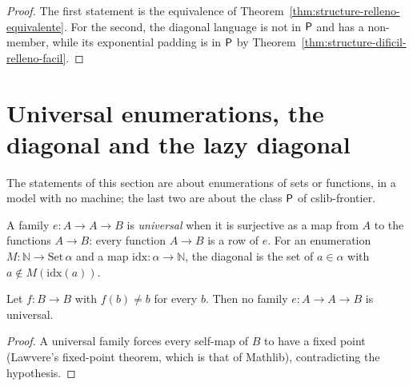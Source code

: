 \begin{proof}
  \leanok
  The first statement is the equivalence of Theorem~\ref{thm:structure-relleno-equivalente}. For the
  second, the diagonal language is not in $\mathsf{P}$ and has a non-member, while its exponential padding is
  in $\mathsf{P}$ by Theorem~\ref{thm:structure-dificil-relleno-facil}.
\end{proof}

\section{Universal enumerations, the diagonal and the lazy diagonal}
\label{sec:structure-diagonal}

The statements of this section are about enumerations of sets or functions, in a model with no
machine; the last two are about the class $\mathsf{P}$ of cslib-frontier.

\begin{definition}
  \label{def:structure-universal}
  \leanok
  A family $e : A \to A \to B$ is \emph{universal} when it is surjective as a map from $A$ to the
  functions $A \to B$: every function $A \to B$ is a row of $e$. For an enumeration $M : \mathbb{N}
  \to \mathrm{Set}\,\alpha$ and a map $\mathrm{idx} : \alpha \to \mathbb{N}$, the diagonal is the set of
  $a \in \alpha$ with $a \notin M(\mathrm{idx}(a))$.
  \own{}
\end{definition}

\begin{theorem}
  \label{thm:structure-sin-universal}
  \leanok
  Let $f : B \to B$ with $f(b) \neq b$ for every $b$. Then no family $e : A \to A \to B$ is universal.
\end{theorem}

\begin{proof}
  \leanok
  A universal family forces every self-map of $B$ to have a fixed point (Lawvere's fixed-point
  theorem, which is that of Mathlib), contradicting the hypothesis.
\end{proof}

